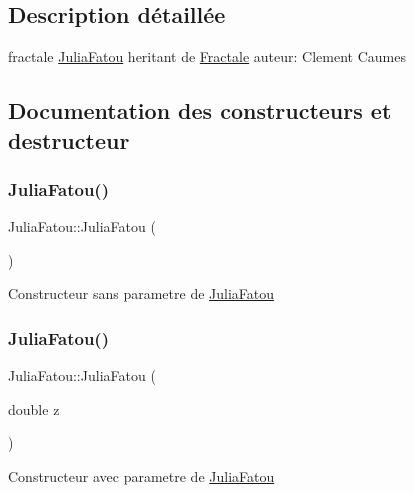 \subsection{Description détaillée}
fractale \hyperlink{classJuliaFatou}{Julia\+Fatou} heritant de \hyperlink{classFractale}{Fractale} auteur\+: Clement Caumes 

\subsection{Documentation des constructeurs et destructeur}
\mbox{\label{classJuliaFatou_a0d41bea63830066fca93cb4123df1b8e}} 
\subsubsection{\texorpdfstring{Julia\+Fatou()}{JuliaFatou()}\hspace{0.1cm}{\footnotesize\ttfamily [1/3]}}
{\footnotesize\ttfamily Julia\+Fatou\+::\+Julia\+Fatou (\begin{DoxyParamCaption}{ }\end{DoxyParamCaption})}

Constructeur sans parametre de \hyperlink{classJuliaFatou}{Julia\+Fatou} \mbox{\label{classJuliaFatou_a66e5f0b4ca4434b156162545048e8c51}} 
\subsubsection{\texorpdfstring{Julia\+Fatou()}{JuliaFatou()}\hspace{0.1cm}{\footnotesize\ttfamily [2/3]}}
{\footnotesize\ttfamily Julia\+Fatou\+::\+Julia\+Fatou (\begin{DoxyParamCaption}\item[{double}]{z }\end{DoxyParamCaption})}

Constructeur avec parametre de \hyperlink{classJuliaFatou}{Julia\+Fatou} \mbox{\label{classJuliaFatou_aacc9e685e952fcf3c048f4fa4bd2d0d7}} 
